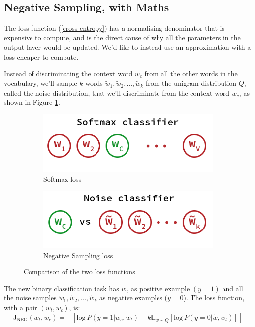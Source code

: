 \subsection{Negative Sampling, with Maths}
The loss function (\ref{cross-entropy}) has a normalising denominator that is expensive to compute, and is the direct cause of why all the parameters in the output layer would be updated. We'd like to instead use an approximation with a loss cheaper to compute.

Instead of discriminating the context word $w_c$ from all the other words in the vocabulary, we'll sample $k$ words $\tilde{w}_1, \tilde{w}_2, ..., \tilde{w}_k$ from the unigram distribution $Q$, called the noise distribution, that we'll discriminate from the context word $w_c$, as shown in Figure \ref{discri}.

\begin{figure}[H]
    \begin{subfigure}{.5\textwidth}
        \centering
        \includegraphics[width=0.9\linewidth]{Images/discri-softmax.png}
        \caption{Softmax loss}
    \end{subfigure}
    \begin{subfigure}{.5\textwidth}
        \centering
        \includegraphics[width=0.9\linewidth]{Images/discri-noise.png}
        \caption{Negative Sampling loss}
    \end{subfigure}
    \caption{Comparison of the two loss functions}
    \label{discri}
\end{figure}

The new binary classification task has $w_c$ as positive example $(y=1)$ and all the noise samples $\tilde{w}_1, \tilde{w}_2, ..., \tilde{w}_k$  as negative examples ($y=0$). The loss function, with a pair $(w_t, w_c)$, is:
\begin{equation}
    \text{J}_{\text{NEG}}(w_t, w_c)  = -[\text{log}~P(y=1| w_c, w_t) + k\mathbb{E}_{\tilde{w}\sim Q}[\text{log}~P(y=0|\tilde{w}, w_t)]]
\end{equation}

